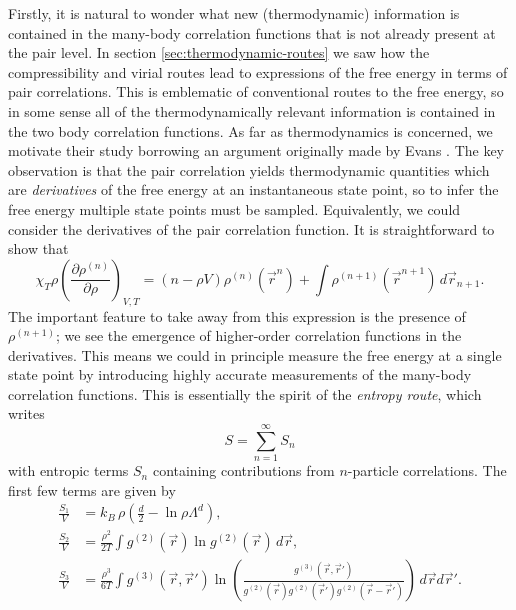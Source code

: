\documentclass[11pt,twoside]{report}
\begin{document}
Firstly, it is natural to wonder what new (thermodynamic) information is contained in the many-body correlation functions that is not already present at the pair level.
In section \ref{sec:thermodynamic-routes} we saw how the compressibility and virial routes lead to expressions of the free energy in terms of pair correlations.
This is emblematic of conventional routes to the free energy, so in some sense all of the thermodynamically relevant information is contained in the two body correlation functions.
As far as thermodynamics is concerned, we motivate their study borrowing an argument originally made by Evans \cite{EvansPrivate2019}.
The key observation is that the pair correlation yields thermodynamic quantities which are \emph{derivatives} of the free energy at an instantaneous state point, so to infer the free energy multiple state points must be sampled.
Equivalently, we could consider the derivatives of the pair correlation function.
It is straightforward to show that \cite{Santos2016}
\begin{equation}\label{eq:correlation-derivatives}
  \chi_T \rho
  \left( \frac{\partial \rho^{(n)}}{\partial \rho} \right)_{V,T}
  =
  (n - \rho V) \rho^{(n)}(\vec{r}^n)
  + \int \rho^{(n+1)}(\vec{r}^{n+1}) \, d\vec{r}_{n+1}.
\end{equation}
The important feature to take away from this expression is the presence of $\rho^{(n+1)}$; we see the emergence of higher-order correlation functions in the derivatives.
This means we could in principle measure the free energy at a single state point by introducing highly accurate measurements of the many-body correlation functions.
This is essentially the spirit of the \emph{entropy route}, which writes \cite{WallaceJCP1987}
\begin{equation}
  S = \sum_{n=1}^\infty S_n
\end{equation}
with entropic terms $S_n$ containing contributions from $n$-particle correlations.
The first few terms are given by \cite{WallaceJCP1987}
\begin{subequations}
  \begin{align}
    \frac{S_1}{V}%
    &=
    k_B \, \rho \left( \frac{d}{2} - \ln{\rho \Lambda^d} \right),
    \\
    \frac{S_2}{V}%
    &=
    \frac{\rho^2}{2 T}
    \int g^{(2)}(\vec{r}) \ln{g^{(2)}(\vec{r})}
    \, d\vec{r},
    \\
    \frac{S_3}{V}%
    &=
    \frac{\rho^3}{6 T}
    \int g^{(3)}(\vec{r}, \vec{r}')
    \ln{\left(
      \frac{
        g^{(3)}(\vec{r}, \vec{r}')
      }{
        g^{(2)}(\vec{r}) g^{(2)}(\vec{r}') g^{(2)}(\vec{r} - \vec{r}')
      }
      \right)}
    \, d\vec{r} d\vec{r}'.
  \end{align}
\end{subequations}
\end{document}
